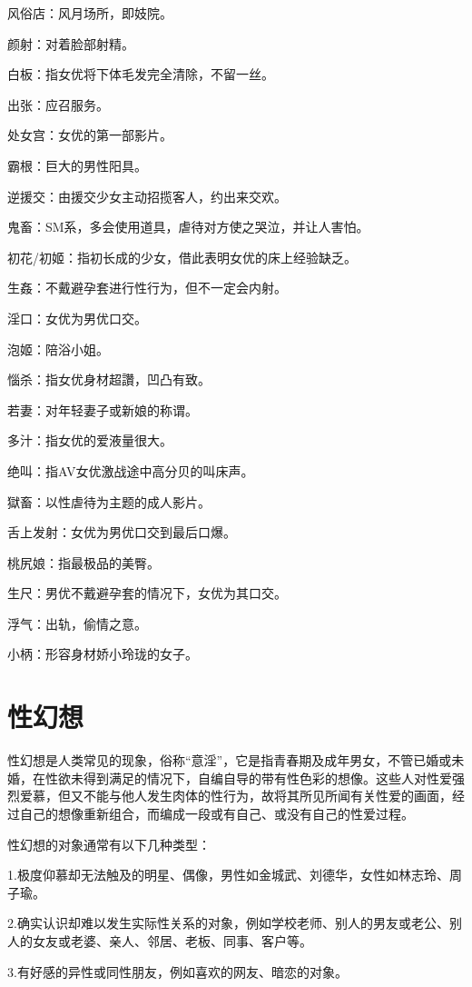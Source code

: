 \documentclass[12pt,UTF8]{ctexbook}
\begin{document}
风俗店：风月场所，即妓院。

颜射：对着脸部射精。

白板：指女优将下体毛发完全清除，不留一丝。

出张：应召服务。

处女宫：女优的第一部影片。

霸根：巨大的男性阳具。

逆援交：由援交少女主动招揽客人，约出来交欢。

鬼畜：SM系，多会使用道具，虐待对方使之哭泣，并让人害怕。

初花/初姬：指初长成的少女，借此表明女优的床上经验缺乏。

生姦：不戴避孕套进行性行为，但不一定会内射。

淫口：女优为男优口交。

泡姬：陪浴小姐。

惱杀：指女优身材超讚，凹凸有致。

若妻：对年轻妻子或新娘的称谓。

多汁：指女优的爱液量很大。

绝叫：指AV女优激战途中高分贝的叫床声。

獄畜：以性虐待为主题的成人影片。

舌上发射：女优为男优口交到最后口爆。

桃尻娘：指最极品的美臀。

生尺：男优不戴避孕套的情况下，女优为其口交。

浮气：出轨，偷情之意。

小柄：形容身材娇小玲珑的女子。

\chapter{性幻想}

性幻想是人类常见的现象，俗称“意淫”，它是指青春期及成年男女，不管已婚或未婚，在性欲未得到满足的情况下，自编自导的带有性色彩的想像。这些人对性爱强烈爱慕，但又不能与他人发生肉体的性行为，故将其所见所闻有关性爱的画面，经过自己的想像重新组合，而编成一段或有自己、或没有自己的性爱过程。

性幻想的对象通常有以下几种类型：

1.极度仰慕却无法触及的明星、偶像，男性如金城武、刘德华，女性如林志玲、周子瑜。

2.确实认识却难以发生实际性关系的对象，例如学校老师、别人的男友或老公、别人的女友或老婆、亲人、邻居、老板、同事、客户等。

3.有好感的异性或同性朋友，例如喜欢的网友、暗恋的对象。
\end{document}
